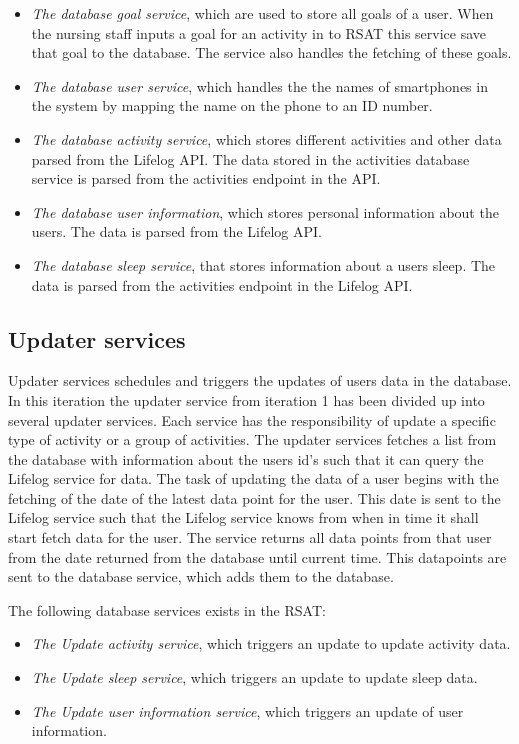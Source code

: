 \documentclass{cslthse-msc}
\begin{document}
\begin{itemize}
\item \emph{The database goal service}, which are used to store all goals of a user. When the nursing staff inputs a goal for an activity in to RSAT this service save that goal to the database. The service also handles the fetching of these goals. %
\item \emph{The database user service}, which handles the the names of smartphones in the system by mapping the name on the phone to an ID number. %
\item \emph{The database activity service}, which stores different activities and other data parsed from the Lifelog API. The data stored in the activities database service is parsed from the activities endpoint in the API. 
\item \emph{The database user information}, which stores personal information about the users. The data is parsed from the Lifelog API.
\item \emph{The database sleep service}, that stores information about a users sleep. The data is parsed from the activities endpoint in the Lifelog API.
\end{itemize}

\subsection{Updater services}
Updater services schedules and triggers the updates of users data in the database. In this iteration the updater service from iteration 1 has been divided up into several updater services. Each service has the responsibility of update a specific type of activity or a group of activities. The updater services fetches a list from the database with information about the users id’s such that it can query the Lifelog service for data. The task of updating the data of a user begins with the fetching of the date of the latest data point for the user. This date is sent to the Lifelog service such that the Lifelog service knows from when in time it shall start fetch data for the user. The service returns all data points from that user from the date returned from the database until current time. This datapoints are sent to the database service, which adds them to the database. 

The following database services exists in the RSAT:

\begin{itemize}
\item \emph{The Update activity service}, which triggers an update to update activity data.
\item \emph{The Update sleep service}, which triggers an update to update sleep data.
\item \emph{The Update user information service}, which triggers an update of user information.
\end{itemize}
\end{document}
